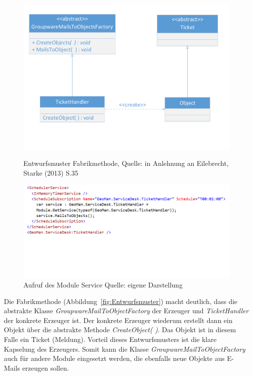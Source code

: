 \begin{figure}[htb]
    \centering
    \begin{minipage}[t]{0.47\textwidth}
        \centering
        \includegraphics[width=.90\textwidth]{Abbildungen/Entwurfsmuster.pdf}
        \caption[Entwurfsmuster Fabrikmethode]{Entwurfsmuster Fabrikmethode, Quelle: in Anlehnung an Eilebrecht, Starke (2013) S.35}
        \label{fig:Entwurfsmuster}
    \end{minipage}%
    \hfill
    \begin{minipage}[t]{0.47\textwidth}
        \centering
        \includegraphics[width=.99\textwidth]{Abbildungen/ModuleService.png}
        \caption[Aufruf des Module Service]{Aufruf des Module Service Quelle: eigene Darstellung}
        \label{fig:ModuleService}
    \end{minipage}
\end{figure}

\noindent
Die Fabrikmethode (Abbildung~\ref{fig:Entwurfsmuster}) macht deutlich, dass die abstrakte Klasse \textit{GroupwareMailToObjectFactory} der Erzeuger und \textit{TicketHandler} der konkrete Erzeuger ist. Der konkrete Erzeuger wiederum erstellt dann ein Objekt über die abstrakte Methode \textit{CreateObject( )}. Das Objekt ist in diesem Falle ein Ticket (Meldung). Vorteil dieses Entwurfsmusters ist die klare Kapselung des Erzeugers. Somit kann die Klasse \textit{GroupwareMailToObjectFactory} auch für andere Module eingesetzt werden, die ebenfalls neue Objekte aus E-Mails erzeugen sollen.\\

